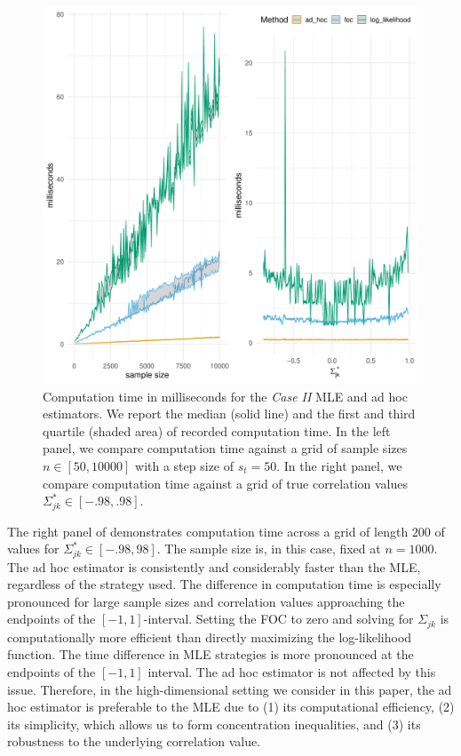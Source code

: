 \begin{figure}\label{fig:case2_speed}
    \includegraphics[width=\textwidth]{Figures/case_2_speed_comp.pdf}
    \caption{Computation time in milliseconds for the \textit{Case II} MLE and ad hoc estimators. We report the median (solid line) and the first and third quartile (shaded area) of recorded computation time. In the left panel, we compare computation time against a grid of sample sizes \(n \in [50, 10000]\) with a step size of \(s_t = 50\). In the right panel, we compare computation time against a grid of true correlation values \(\Sigma^*_{jk} \in [-.98, .98]\).}
\end{figure}

The right panel of  demonstrates computation time across a grid of length \(200\) of values for \(\Sigma_{jk}^* \in [-.98, 98]\). The sample size is, in this case, fixed at \(n=1000\). The ad hoc estimator is consistently and considerably faster than the MLE, regardless of the strategy used. The difference in computation time is especially pronounced for large sample sizes and correlation values approaching the endpoints of the $[-1,1]$-interval. Setting the FOC to zero and solving for \(\Sigma_{jk}\) is computationally more efficient than directly maximizing the log-likelihood function. The time difference in MLE strategies is more pronounced at the endpoints of the $[-1,1]$ interval. The ad hoc estimator is not affected by this issue. Therefore, in the high-dimensional setting we consider in this paper, the ad hoc estimator is preferable to the MLE due to (1) its computational efficiency, (2) its simplicity, which allows us to form concentration inequalities, and (3) its robustness to the underlying correlation value.

